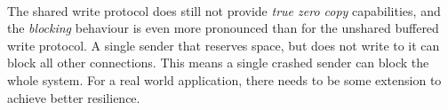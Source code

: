 \paragraph{} The shared write protocol does still not provide \emph{true zero copy} capabilities, and the \emph{blocking}
behaviour is even more pronounced than for the unshared buffered write protocol. A single sender that reserves space, but does not
write to it can block all other connections. This means a single crashed sender can block the whole system. For a real world
application, there needs to be some extension to achieve better resilience.

